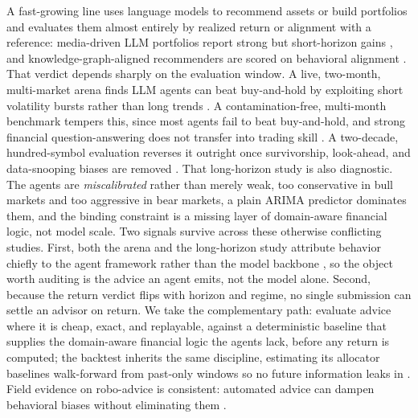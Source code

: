 \documentclass[sigconf,review,anonymous]{acmart}
\begin{document}
A fast-growing line uses language models to recommend assets or build portfolios and evaluates them almost entirely by realized return or alignment with a reference: media-driven LLM portfolios report strong but short-horizon gains \cite{oh2025alpha}, and knowledge-graph-aligned recommenders are scored on behavioral alignment \cite{spadea2025flarko}. That verdict depends sharply on the evaluation window. A live, two-month, multi-market arena finds LLM agents can beat buy-and-hold by exploiting short volatility bursts rather than long trends \cite{qian2026ama}. A contamination-free, multi-month benchmark tempers this, since most agents fail to beat buy-and-hold, and strong financial question-answering does not transfer into trading skill \cite{chen2025stockbench}. A two-decade, hundred-symbol evaluation reverses it outright once survivorship, look-ahead, and data-snooping biases are removed \cite{li2026finsaber}. That long-horizon study is also diagnostic. The agents are \emph{miscalibrated} rather than merely weak, too conservative in bull markets and too aggressive in bear markets, a plain ARIMA predictor dominates them, and the binding constraint is a missing layer of domain-aware financial logic, not model scale. Two signals survive across these otherwise conflicting studies. First, both the arena and the long-horizon study attribute behavior chiefly to the agent framework rather than the model backbone \cite{qian2026ama, li2026finsaber}, so the object worth auditing is the advice an agent emits, not the model alone. Second, because the return verdict flips with horizon and regime, no single submission can settle an advisor on return. We take the complementary path: evaluate advice where it is cheap, exact, and replayable, against a deterministic baseline that supplies the domain-aware financial logic the agents lack, before any return is computed; the backtest inherits the same discipline, estimating its allocator baselines walk-forward from past-only windows so no future information leaks in \cite{bailey2014pseudo}. Field evidence on robo-advice is consistent: automated advice can dampen behavioral biases without eliminating them \cite{dacunto2019robo}.
\end{document}
